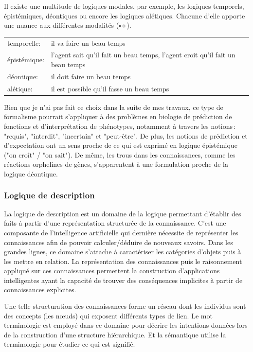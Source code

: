 \begin{refsegment}
    Il existe une multitude de logiques modales, par exemple, les logiques temporels, épistémiques, déontiques ou encore les logiques alétiques. Chacune d'elle apporte une nuance aux différentes modalités ($\square \diamond$).
    
    \begin{tabular}{ll}
        temporelle:    & il va faire un beau temps \\
        épistémique:   & l'agent sait qu'il fait un beau temps,  l'agent croit qu'il fait un beau temps \\
        déontique:     & il doit faire un beau temps \\
        alétique:      & il est possible qu'il fasse un beau temps \\
    \end{tabular}

    Bien que je n'ai pas fait ce choix dans la suite  de mes travaux, ce type de formalisme pourrait s’appliquer à des problèmes en biologie de prédiction de fonctions et d’interprétation de phénotypes, notamment à travers les notions : "requis", "interdit", "incertain" et "peut-être".  De plus, les notions de prédiction et d'expectation ont un sens proche de ce qui est exprimé en logique épistémique ("on croît" / "on sait"). De même, les trous dans les connaissances, comme les réactions orphelines de gènes, s’apparentent à  une formulation proche de la logique déontique.
    
    
    
    \subsubsection{Logique de description}
    
    La logique de description est un domaine de la logique permettant d'établir des faits à partir d’une représentation structurée de la connaissance. C'est une composante de l'intelligence artificielle qui dernière nécessite de représenter les connaissances afin de pouvoir calculer/déduire de nouveaux savoirs. Dans les grandes lignes, ce domaine s'attache à caractériser les catégories d'objets puis à les mettre en relation. La représentation des connaissances puis le raisonnement appliqué sur ces connaissances permettent la construction d'applications intelligentes ayant la capacité de trouver des conséquences implicites à partir de connaissances explicites.
    
    Une telle structuration des connaissances forme un réseau dont les individus sont des concepts (les nœuds) qui exposent différents types de lien. Le mot terminologie est employé dans ce domaine pour décrire les intentions données lors de la construction d'une structure hiérarchique. Et la sémantique utilise la terminologie pour étudier ce qui est signifié.
    

\end{refsegment}
